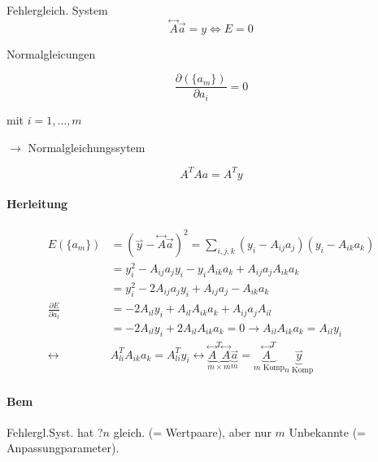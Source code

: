 \documentclass[a4paper,ngerman]{scrbook}
\newcommand{\rharp}[1]{\ensuremath{\overset{\rightharpoonup}{#1}}}%
\begin{document}
Fehlergleich. System
\[
\overset{\leftrightarrow}{A} \vec{a} =  y \iff E = 0
\]

Normalgleicungen 

\[
\frac{\partial (\{a_m\})}{\partial a_i} = 0
\]

mit $i=1,\dots,m$

$\to$ Normalgleichungssytem

\[
\boxed{A^T A a = A^T y}
\]

\paragraph{Herleitung}

\begin{align*}
  E(\{a_m\}) &= (\overset{\rightharpoonup}{y} - \overset{\leftrightarrow}{A} \vec{a})^2 = \sum_{i,j,k} (y_i - A_{ij} a_j)(y_i-A_{ik} a_k)\\
&= y_i^2 - A_{ij} a_j y_i - y_i A_{ik} a_k + A_{ij} a_j A_{ik} a_k\\
&= y_i^2 - 2A_{ij} a_j y_i + A_{ij} a_j - A_{ik} a_k\\
\frac{\partial E}{\partial a_l} &= -2A_{il} y_i + A_{il} A_{ik} a_k + A_{ij} a_j A_{il}\\
&= -2A_{il} y_i + 2A_{il} A_{ik} a_k = 0 \to A_{il} A_{ik} a_k = A_{il}y_i\\
\leftrightarrow& A^T_{li} A_{ik} a_k = A^T_{li} y_i \leftrightarrow \boxed{\underbrace{\overset{\leftrightarrow}{A}^T\overset{\leftrightarrow}{A}}_{m\times m} \underbrace{\rharp{a}}_{m} = \underbrace{\overset{\leftrightarrow}{A}^T}_{\text{$m$ Komp}} \underbrace{\rharp{y}}_{\text{$n$ Komp}}}
\end{align*}

\paragraph{Bem}

Fehlergl.Syst. hat ?$n$ gleich. (= Wertpaare), aber nur $m$ Unbekannte (= Anpassungparameter). 
\end{document}
